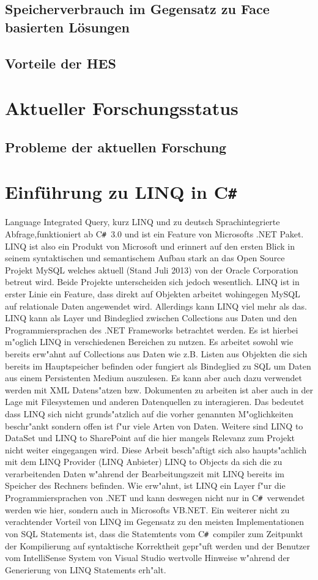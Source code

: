 \documentclass[12pt,a4paper]{scrreprt}
\newcommand{\CS}{C\texttt{\#}}
\newcommand{\CSS}{C\texttt{\# }}
\begin{document}
		\subsection {Speicherverbrauch im Gegensatz zu Face basierten Lösungen}
		\subsection {Vorteile der HES}
	\section {Aktueller Forschungsstatus}
		\subsection {Probleme der aktuellen Forschung}
	\section {Einführung zu LINQ in \CS}
		Language Integrated Query, kurz LINQ und zu deutsch Sprachintegrierte Abfrage,funktioniert ab \CSS 3.0 und ist ein Feature von Microsofts .NET Paket. LINQ ist also ein Produkt von Microsoft und erinnert auf den ersten Blick in seinem syntaktischen und semantischem Aufbau stark an das Open Source Projekt MySQL welches aktuell (Stand Juli 2013) von der Oracle Corporation betreut wird. Beide Projekte unterscheiden sich jedoch wesentlich. LINQ ist in erster Linie ein Feature, dass direkt auf Objekten arbeitet wohingegen MySQL auf relationale Daten angewendet wird. Allerdings kann LINQ viel mehr als das. LINQ kann als Layer und Bindeglied zwischen Collections aus Daten und den Programmiersprachen des .NET Frameworks betrachtet werden. Es ist hierbei m"oglich LINQ in verschiedenen Bereichen zu nutzen. Es arbeitet sowohl wie bereits erw"ahnt auf Collections aus Daten wie z.B. Listen aus Objekten die sich bereits im Hauptspeicher befinden oder fungiert als Bindeglied zu SQL um Daten aus einem Persistenten Medium auszulesen. Es kann aber auch dazu verwendet werden mit XML Datens"atzen bzw. Dokumenten zu arbeiten ist aber auch in der Lage mit Filesystemen und anderen Datenquellen zu interagieren. Das bedeutet dass LINQ sich nicht grunds"atzlich auf die vorher genannten M"oglichkeiten beschr"ankt sondern offen ist f"ur viele Arten von Daten. Weitere sind LINQ to DataSet und LINQ to SharePoint auf die hier mangels Relevanz zum Projekt nicht weiter eingegangen wird. Diese Arbeit besch"aftigt sich also haupts"achlich mit dem LINQ Provider (LINQ Anbieter) LINQ to Objects da sich die zu verarbeitenden Daten w"ahrend der Bearbeitungszeit mit LINQ bereits im Speicher des Rechners befinden. Wie erw"ahnt, ist LINQ ein Layer f"ur die Programmiersprachen von .NET und kann deswegen nicht nur in \CSS verwendet werden wie hier, sondern auch in Microsofts VB.NET.  Ein weiterer nicht zu verachtender Vorteil von LINQ im Gegensatz zu den meisten Implementationen von SQL Statements ist, dass die Statemtents vom \CSS compiler zum Zeitpunkt der Kompilierung auf syntaktische Korrektheit gepr"uft werden und der Benutzer vom IntelliSense System von Visual Studio wertvolle Hinweise w"ahrend der Generierung von LINQ Statements erh"alt.
\end{document}
